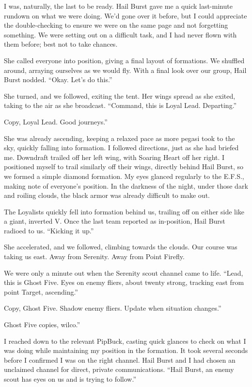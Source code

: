 I was, naturally, the last to be ready. Hail Burst gave me a quick last-minute rundown on what we were doing. We’d gone over it before, but I could appreciate the double-checking to ensure we were on the same page and not forgetting something. We were setting out on a difficult task, and I had never flown with them before; best not to take chances.

She called everyone into position, giving a final layout of formations. We shuffled around, arraying ourselves as we would fly. With a final look over our group, Hail Burst nodded. “Okay. Let’s do this.”

She turned, and we followed, exiting the tent. Her wings spread as she exited, taking to the air as she broadcast. “Command, this is Loyal Lead. Departing.”

\leavevmode{}Copy, Loyal Lead. Good journeys.”

She was already ascending, keeping a relaxed pace as more pegasi took to the sky, quickly falling into formation. I followed directions, just as she had briefed me. Downdraft trailed off her left wing, with Soaring Heart off her right. I positioned myself to trail similarly off their wings, directly behind Hail Burst, so we formed a simple diamond formation. My eyes glanced regularly to the E.F.S., making note of everyone’s position. In the darkness of the night, under those dark and roiling clouds, the black armor was already difficult to make out.

The Loyalists quickly fell into formation behind us, trailing off on either side like a giant, inverted V. Once the last team reported as in-position, Hail Burst radioed to us. “Kicking it up.”

She accelerated, and we followed, climbing towards the clouds. Our course was taking us east. Away from Serenity. Away from Point Firefly.

We were only a minute out when the Serenity scout channel came to life. “Lead, this is Ghost Five. Eyes on enemy fliers, about twenty strong, tracking east from point Target, ascending.”

\leavevmode{}Copy, Ghost Five. Shadow enemy fliers. Update when situation changes.”

\leavevmode{}Ghost Five copies, wilco.”

I reached down to the relevant PipBuck, casting quick glances to check on what I was doing while maintaining my position in the formation. It took several seconds before I confirmed I was on the right channel. Hail Burst and I had chosen an unclaimed channel for direct, private communications. “Hail Burst, an enemy scout has eyes on us and is trying to follow.”

